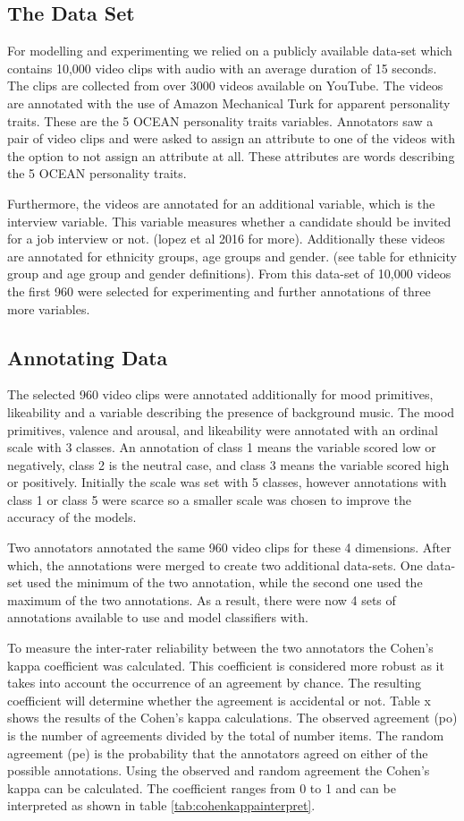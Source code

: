 \subsection{The Data Set}
For modelling and experimenting we relied on a publicly available data-set which contains 10,000 video clips with audio with an average duration of 15 seconds. The clips are collected from over 3000 videos available on YouTube. The videos are annotated with the use of Amazon Mechanical Turk for apparent personality traits. These are the 5 OCEAN personality traits variables. Annotators saw a pair of video clips and were asked to assign an attribute to one of the videos with the option to not assign an attribute at all. These attributes are words describing the 5 OCEAN personality traits. 

Furthermore, the videos are annotated for an additional variable, which is the interview variable. This variable measures whether a candidate should be invited for a job interview or not. (lopez et al 2016 for more). Additionally these videos are annotated for ethnicity groups, age groups and gender. (see table for ethnicity group and age group and gender definitions). From this data-set of 10,000 videos the first 960 were selected for experimenting and further annotations of three more variables. 

\subsection{Annotating Data}
The selected 960 video clips were annotated additionally for mood primitives, likeability and a variable describing the presence of background music. The mood primitives, valence and arousal, and likeability were annotated with an ordinal scale with 3 classes. An annotation of class 1 means the variable scored low or negatively, class 2 is the neutral case, and class 3 means the variable scored high or positively. Initially the scale was set with 5 classes, however annotations with class 1 or class 5 were scarce so a smaller scale was chosen to improve the accuracy of the models. 

Two annotators annotated the same 960 video clips for these 4 dimensions. After which, the annotations were merged to create two additional data-sets. One data-set used the minimum of the two annotation, while the second one used the maximum of the two annotations. As a result, there were now 4 sets of annotations available to use and model classifiers with.

To measure the inter-rater reliability between the two annotators the Cohen's kappa coefficient was calculated. This coefficient is considered more robust as it takes into account the occurrence of an agreement by chance. The resulting coefficient will determine whether the agreement is accidental or not. Table x shows the results of the Cohen's kappa calculations. The observed agreement (po) is the number of agreements divided by the total of number items. The random agreement (pe) is the probability that the annotators agreed on either of the possible annotations. Using the observed and random agreement the Cohen's kappa can be calculated. The coefficient ranges from 0 to 1 and can be interpreted as shown in table \ref{tab:cohenkappainterpret}.

